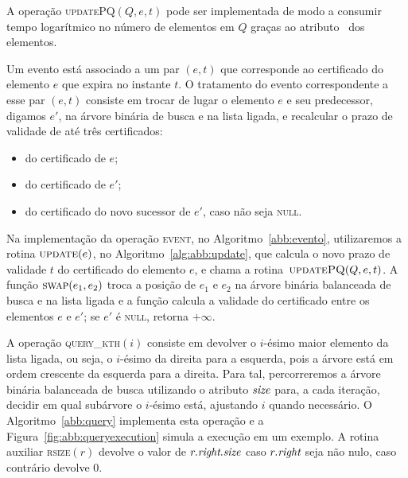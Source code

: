 A operação \textsc{updatePQ}$(Q,e,t)$ pode ser implementada de modo
a consumir tempo logarítmico no número de elementos em $Q$ graças ao
atributo \pqpos~dos elementos.

Um evento está associado a um par $(e, t)$ que corresponde ao
certificado do elemento $e$ que expira no instante $t$.
O tratamento do evento correspondente a esse par $(e, t)$ consiste em trocar de
lugar o elemento $e$ e seu predecessor, digamos $e'$, na árvore
binária de busca e na lista ligada, e recalcular o prazo de validade
de até três certificados:

\begin{itemize}
    \item do certificado de $e$;
    \item do certificado de $e'$;
    \item do certificado do novo sucessor de $e'$, caso não seja \textsc{null}.
\end{itemize}

Na implementação da operação \textsc{event}, no Algoritmo~\ref{abb:evento}, utilizaremos a rotina
$\textsc{update}(e)$, no Algoritmo~\ref{alg:abb:update}, que calcula o novo prazo de validade $t$
do certificado do elemento $e$, e chama a rotina~$\textsc{updatePQ}(Q, e, t)$.
A função $\textsc{swap}(e_1, e_2)$ troca a posição de $e_1$ e $e_2$ na árvore binária balanceada
de busca e na lista ligada e a função  calcula
a validade do certificado entre os elementos $e$ e $e'$; se $e'$ é
\textsc{null}, retorna $+\infty$.









A operação \textsc{query\_kth}$(i)$ consiste em devolver o $i$-ésimo
maior elemento da lista ligada, ou seja, o $i$-ésimo da direita para
a esquerda, pois a árvore está em ordem crescente da esquerda para a
direita.
Para tal, percorreremos a árvore binária balanceada de busca utilizando o atributo $\textit{size}$
para, a cada iteração, decidir em qual subárvore o $i$-ésimo está, ajustando $i$ quando
necessário.
O Algoritmo~\ref{abb:query} implementa esta operação e a Figura~\ref{fig:abb:queryexecution}
simula a execução em um exemplo.
A rotina auxiliar \textsc{rsize}$(r)$ devolve o valor de $r.\textit{right}.\textit{size}$ caso $r.\textit{right}$ seja
não nulo, caso contrário devolve $0$.

